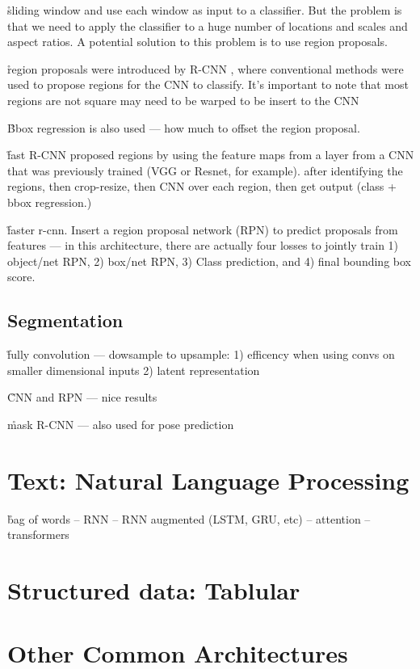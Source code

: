 \r{sliding window and use each window as input to a classifier. But the problem is that we need to apply the classifier to a huge number of locations and scales and aspect ratios. A potential solution to this problem is to use region proposals.}

\r{region proposals were introduced by R-CNN , where conventional methods were used to propose regions for the CNN to classify. It's important to note that most regions are not square may need to be warped to be insert to the CNN}

\r{Bbox regression is also used --- how much to offset the region proposal.}


\r{fast R-CNN proposed regions by using the feature maps from a layer from a CNN that was previously trained (VGG or Resnet, for example). after identifying the regions, then crop-resize, then CNN over each region, then get output (class + bbox regression.)}

\r{faster r-cnn. Insert a region proposal network (RPN) to predict proposals from features --- in this architecture, there are actually four losses to jointly train 1) object/net RPN, 2) box/net RPN, 3) Class prediction, and 4) final bounding box score.}



% 


\subsection{Segmentation}

\r{fully convolution --- dowsample to upsample: 1) efficency when using convs on smaller dimensional inputs 2) latent representation}

\r{CNN and RPN --- nice results }

\r{mask R-CNN --- also used for pose prediction}



\section{Text: Natural Language Processing}

\r{bag of words -- RNN -- RNN augmented (LSTM, GRU, etc) -- attention -- transformers }


\section{Structured data: Tablular}


\section{Other Common Architectures}

